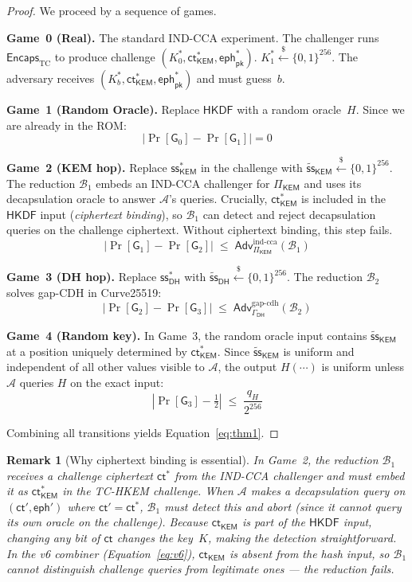 \documentclass[11pt,a4paper]{article}
\newtheorem{remark}[theorem]{Remark}
\newcommand{\Adv}{\mathsf{Adv}}
\newcommand{\KEM}{\mathsf{KEM}}
\renewcommand{\DH}{\mathsf{DH}}
\newcommand{\HKDF}{\mathsf{HKDF}}
\newcommand{\Encaps}{\mathsf{Encaps}}
\newcommand{\ct}{\mathsf{ct}}
\newcommand{\eph}{\mathsf{eph}}
\begin{document}
\begin{proof}
We proceed by a sequence of games.

\medskip\noindent\textbf{Game~0 (Real).}
The standard IND-CCA experiment. The challenger runs
$\Encaps_{\mathrm{TC}}$ to produce challenge $(K_0^*, \ct_{\KEM}^*, \eph_{\mathsf{pk}}^*)$.
$K_1^* \xleftarrow{\$} \{0,1\}^{256}$. The adversary receives
$(K_b^*, \ct_{\KEM}^*, \eph_{\mathsf{pk}}^*)$ and must guess~$b$.

\medskip\noindent\textbf{Game~1 (Random Oracle).}
Replace $\HKDF$ with a random oracle~$H$. Since we are already in the ROM:
\[
|\Pr[\mathsf{G}_0] - \Pr[\mathsf{G}_1]| = 0
\]

\medskip\noindent\textbf{Game~2 (KEM hop).}
Replace $\mathsf{ss}_{\KEM}^*$ in the challenge with
$\widetilde{\mathsf{ss}}_{\KEM} \xleftarrow{\$} \{0,1\}^{256}$.
The reduction $\mathcal{B}_1$ embeds an IND-CCA challenger for
$\Pi_{\KEM}$ and uses its decapsulation oracle to answer
$\mathcal{A}$'s queries. Crucially, $\ct_{\KEM}^*$ is included
in the $\HKDF$ input (\emph{ciphertext binding}), so $\mathcal{B}_1$
can detect and reject decapsulation queries on the challenge
ciphertext. Without ciphertext binding, this step fails.
\[
|\Pr[\mathsf{G}_1] - \Pr[\mathsf{G}_2]|
\;\leq\;
\Adv_{\Pi_{\KEM}}^{\mathrm{ind\text{-}cca}}(\mathcal{B}_1)
\]

\medskip\noindent\textbf{Game~3 (DH hop).}
Replace $\mathsf{ss}_{\DH}^*$ with
$\widetilde{\mathsf{ss}}_{\DH} \xleftarrow{\$} \{0,1\}^{256}$.
The reduction $\mathcal{B}_2$ solves gap-CDH in Curve25519:
\[
|\Pr[\mathsf{G}_2] - \Pr[\mathsf{G}_3]|
\;\leq\;
\Adv_{\Gamma_{\DH}}^{\mathrm{gap\text{-}cdh}}(\mathcal{B}_2)
\]

\medskip\noindent\textbf{Game~4 (Random key).}
In Game~3, the random oracle input contains
$\widetilde{\mathsf{ss}}_{\KEM}$ at a position uniquely
determined by $\ct_{\KEM}^*$. Since $\widetilde{\mathsf{ss}}_{\KEM}$
is uniform and independent of all other values visible to
$\mathcal{A}$, the output $H(\cdots)$ is uniform unless
$\mathcal{A}$ queries $H$ on the exact input:
\[
\left|\Pr[\mathsf{G}_3] - \tfrac{1}{2}\right|
\;\leq\;
\frac{q_H}{2^{256}}
\]

\medskip\noindent
Combining all transitions yields Equation~\eqref{eq:thm1}.
\end{proof}

\begin{remark}[Why ciphertext binding is essential]
In Game~2, the reduction $\mathcal{B}_1$ receives a challenge
ciphertext $\ct^*$ from the IND-CCA challenger and must embed it
as $\ct_{\KEM}^*$ in the TC-HKEM challenge. When $\mathcal{A}$
makes a decapsulation query on $(\ct', \eph')$ where $\ct' = \ct^*$,
$\mathcal{B}_1$ must detect this and abort (since it cannot query its
own oracle on the challenge). Because $\ct_{\KEM}$ is part of the
$\HKDF$ input, changing any bit of $\ct$ changes the key~$K$, making
the detection straightforward. In the v6 combiner (Equation~\ref{eq:v6}),
$\ct_{\KEM}$ is absent from the hash input, so $\mathcal{B}_1$
cannot distinguish challenge queries from legitimate ones --- the
reduction fails.
\end{remark}
\end{document}
